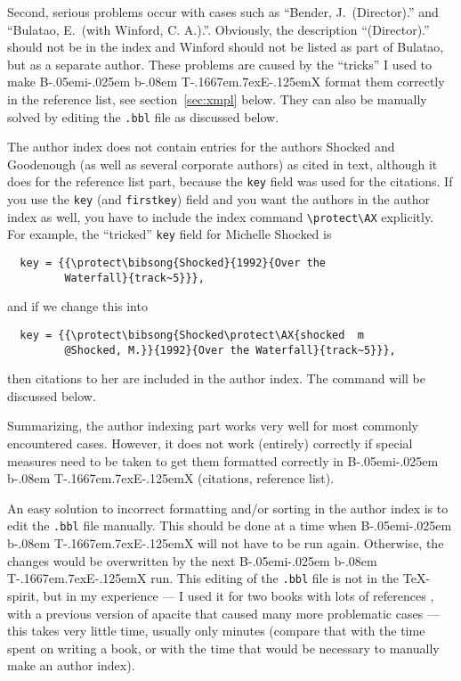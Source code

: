 \documentclass{article}
\newcommand{\bibsong}[4]{}
\def\BibTeX{{\rm B\kern-.05em{\sc i\kern-.025em b}\kern-.08em
    T\kern-.1667em\lower.7ex\hbox{E}\kern-.125emX}}%
\newcommand{\pkg}[1]{\textsf{#1}}%
\newcommand{\fname}[1]{\texttt{#1}}%
\newcommand{\fieldname}[1]{\texttt{#1}}%
\newcommand{\cmd}[1]{\texttt{\string#1}}%
\begin{document}
Second, serious problems occur with cases such as ``Bender, J.~{(Director)}.''
and ``Bulatao, E.~{(with Winford, C. A.)}.''. Obviously, the description
``{(Director)}.'' should not be in the index and Winford should not be listed
as part of Bulatao, but as a separate author. These problems are caused by the
``tricks'' I used to make \BibTeX{} format them correctly in the reference
list, see section~\ref{sec:xmpl} below. They can also be manually solved by
editing the \fname{.bbl} file as discussed below.

The author index does not contain entries for the authors Shocked and
Goodenough (as well as several corporate authors) as cited in text, although
it does for the reference list part, because the \fieldname{key} field was
used for the citations. If you use the \fieldname{key} (and
\fieldname{firstkey}) field and you want the authors in the author index as
well, you have to include the index command \verb+\protect\AX+ explicitly. For
example, the ``tricked'' \fieldname{key} field for Michelle Shocked is
\begin{verbatim}
  key = {{\protect\bibsong{Shocked}{1992}{Over the
         Waterfall}{track~5}}},
\end{verbatim}
and if we change this into
\begin{verbatim}
  key = {{\protect\bibsong{Shocked\protect\AX{shocked  m
         @Shocked, M.}}{1992}{Over the Waterfall}{track~5}}},
\end{verbatim}
then citations to her are included in the author index. The \cmd{\AX} command
will be discussed below.

Summarizing, the author indexing part works very well for most commonly
encountered cases. However, it does not work (entirely) correctly if special
measures need to be taken to get them formatted correctly in \BibTeX{}
(citations, reference list).

An easy solution to incorrect formatting and/or sorting in the author index is
to edit the \fname{.bbl} file manually. This should be done at a time when
\BibTeX{} will not have to be run again. Otherwise, the changes would be
overwritten by the next \BibTeX{} run. This editing of the \fname{.bbl} file
is not in the \TeX-spirit, but in my experience --- I used it for two books
with lots of references \cite{meijer1998,WaMe00}, with a previous version of
\pkg{apacite} that caused many more problematic cases --- this takes very
little time, usually only minutes (compare that with the time spent on writing
a book, or with the time that would be necessary to manually make an author
index).
\end{document}
